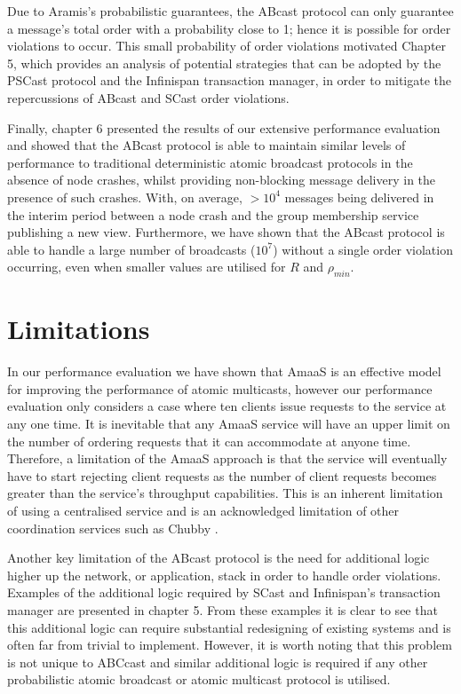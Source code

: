 Due to \textsf{Aramis}'s probabilistic guarantees, the \textsf{ABcast} protocol can only guarantee a message's total order with a probability close to 1; hence it is possible for order violations to occur.  This small probability of order violations motivated Chapter 5, which provides an analysis of potential strategies that can be adopted by the \textsf{PSCast} protocol and the Infinispan transaction manager, in order to mitigate the repercussions of \textsf{ABcast} and SCast order violations.  

Finally, chapter 6 presented the results of our extensive performance evaluation and showed that the \textsf{ABcast} protocol is able to maintain similar levels of performance to traditional deterministic atomic broadcast protocols in the absence of node crashes, whilst providing non-blocking message delivery in the presence of such crashes.  With, on average, $> 10^4$ messages being delivered in the interim period between a node crash and the group membership service publishing a new view.  Furthermore, we have shown that the \textsf{ABcast} protocol is able to handle a large number of broadcasts ($10^7$) without a single order violation occurring, even when smaller values are utilised for $R$ and $\rho_{min}$.  

\section{Limitations}\label{sec:sum_limitations}
In our performance evaluation we have shown that \textsf{AmaaS} is an effective model for improving the performance of atomic multicasts, however our performance evaluation only considers a case where ten clients issue requests to the service at any one time.  It is inevitable that any \textsf{AmaaS} service will have an upper limit on the number of ordering requests that it can accommodate at anyone time.  Therefore, a limitation of the \textsf{AmaaS} approach is that the service will eventually have to start rejecting client requests as the number of client requests becomes greater than the service's throughput capabilities.  This is an inherent limitation of using a centralised service and is an acknowledged limitation of other coordination services such as Chubby \citep{Burrows:2006:CLS:1298455.1298487}.  

Another key limitation of the \textsf{ABcast} protocol is the need for additional logic higher up the network, or application, stack in order to handle order violations.  Examples of the additional logic required by \textsf{SCast} and Infinispan's transaction manager are presented in chapter 5.  From these examples it is clear to see that this additional logic can require substantial redesigning of existing systems and is often far from trivial to implement.  However, it is worth noting that this problem is not unique to \textsf{ABCcast} and similar additional logic is required if any other probabilistic atomic broadcast or atomic multicast protocol is utilised.  

